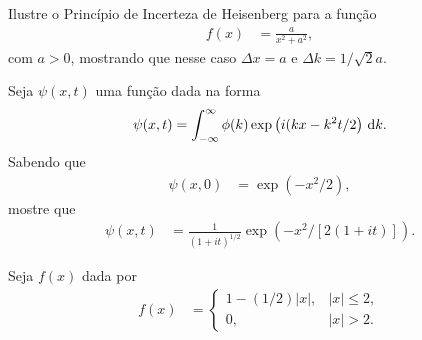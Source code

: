 \documentclass[a4paper,12pt, leqno, answers]{exam}
\begin{document}
\begin{questions}
    \question Ilustre o Princ\'{i}pio de Incerteza de Heisenberg para a
    função
    \begin{align*}
        f(x) &= \frac{a}{x^2 + a^2},
    \end{align*}
    com $a > 0$, mostrando que nesse caso $\Delta x = a$ e $\Delta k = 1 /
    \sqrt{2} a$.
    \begin{solution}
    \end{solution}

    \question Seja $\psi(x, t)$ uma função dada na forma
    \begin{align*}
        \psi(x, t) = \int_{-\infty}^\infty \phi(k) \exp\left( i (k x - k^2 t / 2
        \right) \, \mathrm{d}k.
    \end{align*}
    Sabendo que
    \begin{align*}
        \psi(x, 0) &= \exp(-x^2 / 2),
    \end{align*}
    mostre que
    \begin{align*}
        \psi(x, t) &= \frac{1}{(1 + i t)^{1/2}} \exp\left( -x^2 / \left[ 2 (1 +
        i t) \right] \right).
    \end{align*}

    \question[T3 de 2011] Seja $f(x)$ dada por
    \begin{align*}
        f(x) &= \begin{cases}
            1 - \left( 1/2 \right) |x|, & |x| \leq 2, \\
            0, & |x| > 2.
        \end{cases}
    \end{align*}
    \begin{parts}

\end{parts}
\end{questions}
\end{document}
